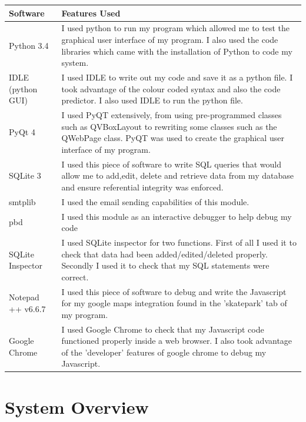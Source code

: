 \begin{center}
\begin{tabular}{|p{3.5cm}|p{8cm}|} \hline
\textbf{Software} & \textbf{Features Used} \\ \hline
Python 3.4 & I used python to run my program which allowed me to test the graphical user interface of my program. I also used the code libraries which came with the installation of Python to code my system.  \\ \hline
IDLE (python GUI) & I used IDLE to write out my code and save it as a python file. I took advantage of the colour coded syntax and also the code predictor. I also used IDLE to run the python file.\\ \hline
PyQt 4 & I used PyQT extensively, from using pre-programmed classes such as QVBoxLayout to rewriting some classes such as the QWebPage class. PyQT was used to create the graphical user interface of my program.\\ \hline
SQLite 3 & I used this piece of software to write SQL queries that would allow me to add,edit, delete and retrieve data from my database and ensure referential integrity was enforced. \\ \hline
smtplib & I used the email sending capabilities of this module. \\ \hline
pbd & I used this module as an interactive debugger to help debug my code \\ \hline
SQLite Inspector & I used SQLite inspector for two functions. First of all I used it to check that data had been added/edited/deleted properly. Secondly I used it to check that my SQL statements were correct. \\ \hline
Notepad ++ v6.6.7 & I used this piece of software to debug and write the Javascript for my google maps integration found in the 'skatepark' tab of my program. \\ \hline
Google Chrome & I used Google Chrome to check that my Javascript code functioned properly inside a web browser. I also took advantage of the 'developer' features of google chrome to debug my Javascript.\\ \hline

\end{tabular}
\label{tab:Software Features Used}
\end{center}

\section{System Overview}


